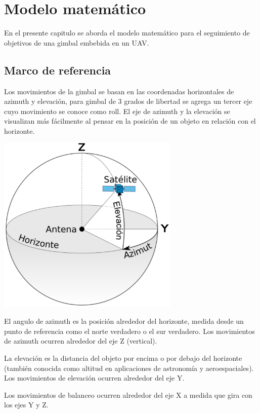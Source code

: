 \chapter{Modelo matemático}

En el presente capitulo se aborda el modelo matemático para el seguimiento de objetivos de una gimbal embebida en un UAV.

\section{Marco de referencia}
Los movimientos de la gimbal se basan en las coordenadas horizontales de azimuth y elevación, para gimbal de 3 grados de libertad
se agrega un tercer eje cuyo movimiento se conoce como roll. El eje de azimuth y la elevación se visualizan más fácilmente al 
pensar en la posición de un objeto en relación con el horizonte.
\begin{center}
	\includegraphics[width=0.65\textwidth]{Contenido/Cuerpo/Capitulo3/Fig1.eps}
	\label{fig:ModeloMat:Fig1}
\end{center}
El angulo de azimuth es la posición alrededor del horizonte, medida desde un punto de referencia como el norte verdadero o el sur 
verdadero. Los movimientos de azimuth ocurren alrededor del eje Z (vertical).

La elevación es la distancia del objeto por encima o por debajo del horizonte (también conocida como altitud en aplicaciones de 
astronomía y aeroespaciales). Los movimientos de elevación ocurren alrededor del eje Y.

Los movimientos de balanceo ocurren alrededor del eje X a medida que gira con los ejes Y y Z.